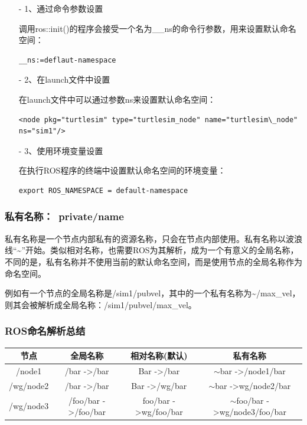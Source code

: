 \documentclass[10pt, oneside]{book}
\begin{document}
\begin{itemize}
    \item[-] 1、通过命令参数设置

    调用ros::init()的程序会接受一个名为\_\_ns的命令行参数，用来设置默认命名空间：

\begin{verbatim}
__ns:=deflaut-namespace
\end{verbatim}

    \item[-] 2、在launch文件中设置
    
    在launch文件中可以通过参数ns来设置默认命名空间：

\begin{verbatim}
<node pkg="turtlesim" type="turtlesim_node" name="turtlesim\_node" ns="sim1"/>
\end{verbatim}

    \item[-] 3、使用环境变量设置
    
    在执行ROS程序的终端中设置默认命名空间的环境变量：

\begin{verbatim}
export ROS_NAMESPACE = default-namespace
\end{verbatim}


\end{itemize}

\subsubsection{私有名称：~private/name}

私有名称是一个节点内部私有的资源名称，只会在节点内部使用。私有名称以波浪线“\textasciitilde”开始。类似相对名称，也需要ROS为其解析，成为一个有意义的全局名称，不同的是，私有名称并不使用当前的默认命名空间，而是使用节点的全局名称作为命名空间。

例如有一个节点的全局名称是/sim1/pubvel，其中的一个私有名称为\textasciitilde/max\_vel，则其会被解析成全局名称：/sim1/pubvel/max\_vel。

\subsubsection{ROS命名解析总结}

\begin{table}[H]
    \begin{tabular}{c|c|c|c}
    \hline
    节点        & 全局名称                            & 相对名称(默认)                         & 私有名称                                         \\ \hline
    /node1    & /bar -\textgreater /bar         & Bar -\textgreater /bar           & $\sim$bar -\textgreater /node1/bar           \\ \hline
    /wg/node2 & /bar -\textgreater /bar         & Bar -\textgreater /wg/bar        & $\sim$bar -\textgreater wg/node2/bar         \\ \hline
    /wg/node3 & /foo/bar -\textgreater /foo/bar & foo/bar -\textgreater wg/foo/bar & $\sim$foo/bar -\textgreater wg/node3/foo/bar \\ \hline
    \end{tabular}
\end{table}
\end{document}
